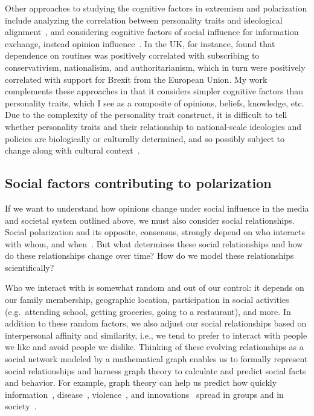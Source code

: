 \documentclass[12pt,letterpaper]{article}
\begin{document}
Other approaches to studying the cognitive factors in extremism and polarization
include analyzing the correlation between personality traits and ideological
alignment~\cite{Rollwage2019}, and considering cognitive factors of social influence 
for information exchange, instead opinion influence~\cite{Carley1990,Carley1991,Bala1998}.
In the UK, for instance,  found that dependence on routines was
positively correlated with subscribing to conservativism, nationalisim, and
authoritarianism, which in turn were positively correlated with support for
Brexit from the European Union. My work complements these approaches in that
it considers simpler cognitive factors than personality traits, which I see
as a composite of opinions, beliefs, knowledge, etc. Due to the complexity of the
personality trait construct, it is difficult to tell whether personality traits
and their relationship to national-scale ideologies and policies
are biologically or culturally determined,
and so possibly subject to change along with cultural 
context~\cite{Claidiere2012c,Smaldino2019d,Falandays2021}.


\subsection{Social factors contributing to polarization}

If we want to understand how opinions change under social influence in the
media and societal system outlined above, we must also consider
social relationships. Social polarization and its opposite, consensus, strongly
depend on who interacts with whom, and when~\cite{Flache2008,Turner2018}. 
But what determines these social relationships and how do these relationships
change over time? How do we model these relationships 
scientifically? 

Who we interact with is somewhat
random and out of our control: it depends on our family membership, geographic location, 
participation in social activities (e.g.\ attending school, getting
groceries, going to a restaurant), and more. In addition to these random factors, 
we also adjust our social relationships based on interpersonal affinity and similarity, 
i.e., we tend to prefer to interact with people we like and avoid people we dislike.
Thinking of these
evolving relationships as a social network modeled by a mathematical graph
enables us to formally represent social relationships and harness graph
theory to calculate and predict social facts and behavior. For example, graph
theory can help us predict how quickly information~\cite{Milgram1967,Travers1969}, 
disease~\cite{Salathe2010,Block2020}, violence~\cite{Epstein2002}, and
innovations~\cite{Deroiain2002,Acemoglu2011a,Kreindler2014}
spread in groups and in society~\cite{Watts1999,Palla2007,Backstrom2012,Wohlgemuth2014}.
\end{document}

